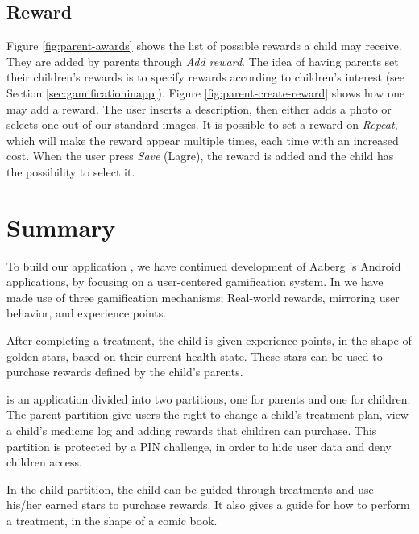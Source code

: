 \subsection{Reward}
\label{sec:description-manage-rewards}
Figure \ref{fig:parent-awards} shows the list of possible rewards a child may receive. They are added by parents through \emph{Add reward}. The idea of having parents set their children's rewards is to specify rewards according to children's interest (see Section \ref{sec:gamificationinapp}). Figure \ref{fig:parent-create-reward} shows how one may add a reward. The user inserts a description, then either adds a photo or selects one out of our standard images. It is possible to set a reward on \emph{Repeat}, which will make the reward appear multiple times, each time with an increased cost.        
When the user press \emph{Save} (Lagre), the reward is added and the child has the possibility to select it. 
 
\section{Summary}

To build our application \app{}, we have continued development of Aaberg \etal{}'s Android applications, by focusing on a user-centered gamification system. In \app{} we have made use of three gamification mechanisms; Real-world rewards, mirroring user behavior, and experience points. 

After completing a treatment, the child is given experience points, in the shape of golden stars, based on their current health state. These stars can be used to purchase rewards defined by the child's parents. 

\app{} is an application divided into two partitions, one for parents and one for children. The parent partition give users the right to change a child's treatment plan, view a child's medicine log and adding rewards that children can purchase. This partition is protected by a PIN challenge, in order to hide user data and deny children access. 

In the child partition, the child can be guided through treatments and use his/her earned stars to purchase rewards. It also gives a guide for how to perform a treatment, in the shape of a comic book.   
